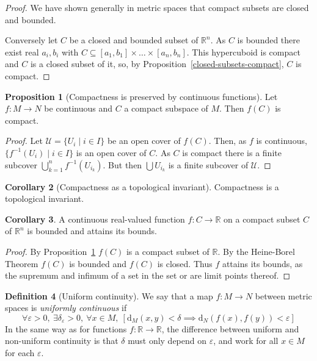 \documentclass[10pt,fleqn]{article}
\newcommand{\met}{\mathrm{d}}
\newcommand{\reals}{\mathbb{R}}
\newcommand{\eps}{\varepsilon}
\theoremstyle{definition} \newtheorem{defn}{Definition}[section]
\theoremstyle{plain}      \newtheorem{thm}[defn]{Theorem}
\theoremstyle{definition} \newtheorem{prop}[defn]{Proposition}
\theoremstyle{definition} \newtheorem{cor}[defn]{Corollary}
\theoremstyle{definition} \newtheorem{ex}[defn]{Example}
\theoremstyle{definition} \newtheorem{rem}[defn]{Remark}
\begin{document}
\begin{proof}
    We have shown generally in metric spaces that compact subsets are closed and bounded.

    Conversely let $C$ be a closed and bounded subset of $\reals^n$.
    As $C$ is bounded there exist real $a_i,b_i$ with $C\subseteq[a_1,b_1]\times\ldots\times[a_n,b_n]$.
    This hypercuboid is compact and $C$ is a closed subset of it, so, by Proposition~\ref{closed-subsets-compact}, $C$ is compact.
\end{proof}

\begin{prop}[Compactness is preserved by continuous functions]\label{compactness-preserved-continuous}
    Let $f:M\to N$ be continuous and $C$ a compact subspace of $M$.
    Then $f(C)$ is compact.
\end{prop}

\begin{proof}
    Let $\mathcal{U}=\{U_i\mid i\in I\}$ be an open cover of $f(C)$.
    Then, as $f$ is continuous, $\{f^{-1}(U_i)\mid i\in I\}$ is an open cover of $C$.
    As $C$ is compact there is a finite subcover $\bigcup_{k=1}^nf^{-1}(U_{i_k})$.
    But then $\bigcup U_{i_k}$ is a finite subcover of $\mathcal{U}$.
\end{proof}

\begin{cor}[Compactness as a topological invariant]
    Compactness is a topological invariant.
\end{cor}

\begin{cor}
    A continuous real-valued function $f:C\to\reals$ on a compact subset $C$ of $\reals^n$ is bounded and attains its bounds.
\end{cor}

\begin{proof}
    By Proposition~\ref{compactness-preserved-continuous} $f(C)$ is a compact subset of $\reals$.
    By the Heine-Borel Theorem $f(C)$ is bounded and $f(C)$ is closed.
    Thus $f$ attains its bounds, as the supremum and infimum of a set in the set or are limit points thereof.
\end{proof}

\begin{defn}[Uniform continuity]
    We say that a map $f:M\to N$ between metric spaces is \emph{uniformly continuous} if
    \[
        \forall\eps>0,~
        \exists\delta_\eps>0,~
        \forall x\in M,~
        [\met_M(x,y)<\delta\implies\met_N(f(x),f(y))<\eps]
    \]
    In the same way as for functions $f:\reals\to\reals$, the difference between uniform and non-uniform continuity is that $\delta$ must only depend on $\eps$, and work for all $x\in M$ for each $\eps$.
\end{defn}
\end{document}
